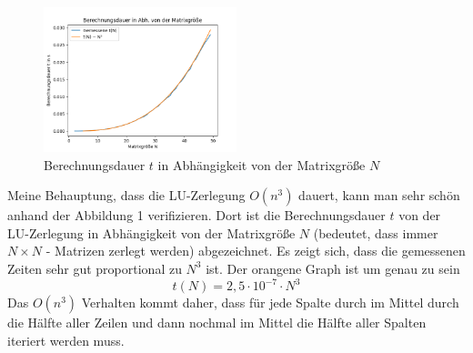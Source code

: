 \documentclass{article}
\begin{document}
	\begin{figure}
		\centering
		\includegraphics[width=0.5\textwidth]{fig1}
		\caption{Berechnungsdauer $t$ in Abhängigkeit von der Matrixgröße $N$}
	\end{figure}
	Meine Behauptung, dass die LU-Zerlegung $O(n^3)$ dauert, kann man sehr schön anhand der Abbildung 1 verifizieren. Dort ist die Berechnungsdauer $t$ von der LU-Zerlegung in Abhängigkeit von der Matrixgröße $N$ (bedeutet, dass immer $N\times N$ - Matrizen zerlegt werden) abgezeichnet. Es zeigt sich, dass die gemessenen Zeiten sehr gut proportional zu $N^3$ ist. Der orangene Graph ist um genau zu sein
	$$t(N) = 2,5 \cdot 10^{-7} \cdot N^3$$
	Das $O(n^3)$ Verhalten kommt daher, dass für jede Spalte durch im Mittel durch die Hälfte aller Zeilen und dann nochmal im Mittel die Hälfte aller Spalten iteriert werden muss.
\end{document}
